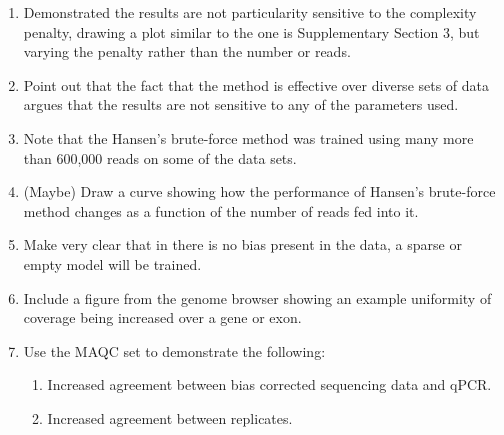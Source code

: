 \documentclass{article}
\begin{document}

\begin{enumerate}

\item Demonstrated the results are not particularity sensitive to the
complexity penalty, drawing a plot similar to the one is Supplementary Section
3, but varying the penalty rather than the number or reads.

\item Point out that the fact that the method is effective over diverse sets of
data argues that the results are not sensitive to any of the parameters used.

\item Note that the Hansen's brute-force method was trained using many more than
600,000 reads on some of the data sets.

\item (Maybe) Draw a curve showing how the performance of Hansen's brute-force
method changes as a function of the number of reads fed into it.

\item Make very clear that in there is no bias present in the data, a sparse or
empty model will be trained.

\item Include a figure from the genome browser showing an example uniformity of
coverage being increased over a gene or exon.

\item Use the MAQC set to demonstrate the following:
\begin{enumerate}
\item Increased agreement between bias corrected sequencing data and qPCR.
\item Increased agreement between replicates.
\end{enumerate}



\end{enumerate}
\end{document}
